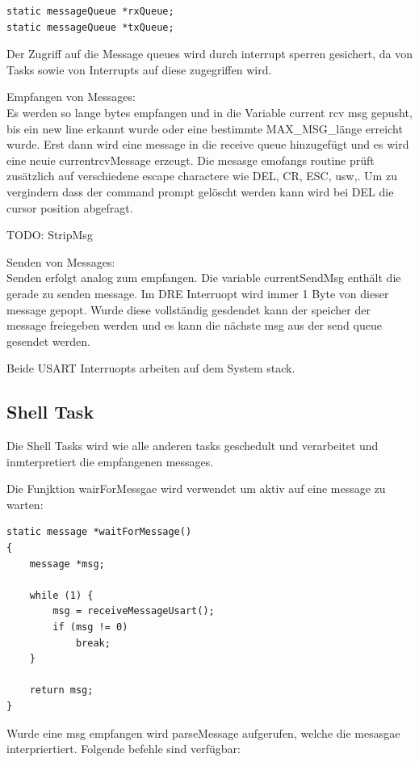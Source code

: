 \documentclass[fontsize=12pt, toc=bibliography, notitlepage]{scrreprt}
\begin{document}
\begin{lstlisting}
static messageQueue *rxQueue;
static messageQueue *txQueue;
\end{lstlisting}

Der Zugriff auf die Message queues wird durch interrupt sperren gesichert, da von Tasks sowie von Interrupts auf diese zugegriffen wird.

Empfangen von Messages: \\
Es werden so lange bytes empfangen und in die Variable current rcv msg gepusht, bis ein new line erkannt wurde oder eine bestimmte MAX\_MSG\_länge erreicht wurde. Erst dann wird eine message in die receive queue hinzugefügt und es wird eine neuie currentrcvMessage erzeugt. Die mesasge emofangs routine prüft zusätzlich auf verschiedene escape charactere wie DEL, CR, ESC, usw,. Um zu vergindern dass der command prompt gelöscht werden kann wird bei DEL die cursor position abgefragt.

TODO: StripMsg

Senden von Messages: \\
Senden erfolgt analog zum empfangen. Die variable currentSendMsg enthält die gerade zu senden message. Im DRE Interruopt wird immer 1 Byte von dieser message gepopt. Wurde diese vollständig gesdendet kann der speicher der message freiegeben werden und es kann die nächste msg aus der send queue gesendet werden.

Beide USART Interruopts arbeiten auf dem System stack.

\subsection{Shell Task}
\label{subsec:shell-task}
Die Shell Tasks wird wie alle anderen tasks geschedult und verarbeitet und inmterpretiert die empfangenen messages.

Die Funjktion wairForMessgae wird verwendet um aktiv auf eine message zu warten:

\begin{lstlisting}
static message *waitForMessage()
{
    message *msg;

    while (1) {
        msg = receiveMessageUsart();
        if (msg != 0)
            break;
    }

    return msg;
}
\end{lstlisting}

Wurde eine msg empfangen wird parseMessage aufgerufen, welche die mesasgae interpriertiert. Folgende befehle sind verfügbar:
\end{document}
